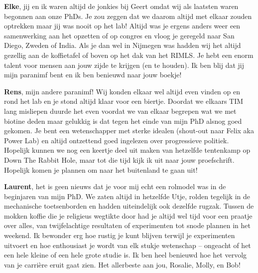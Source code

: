 \textbf{Elke}, jij en ik waren altijd de jonkies bij Geert omdat wij als laatsten waren begonnen aan onze PhDs. Je zou zeggen dat we daarom altijd met elkaar zouden optrekken maar jij was nooit op het lab! Altijd was je ergens anders weer een samenwerking aan het opzetten of op congres en vloog je geregeld naar San Diego, Zweden of India. Als je dan wel in Nijmegen was hadden wij het altijd gezellig aan de koffietafel of boven op het dak van het RIMLS. Je hebt een enorm talent voor mensen aan jouw zijde te krijgen (en te houden). Ik ben blij dat jij mijn paranimf bent en ik ben benieuwd naar jouw boekje!

\textbf{Rens}, mijn andere paranimf! Wij konden elkaar wel altijd even vinden op en rond het lab en je stond altijd klaar voor een biertje. Doordat we elkaars TIM lang misliepen duurde het even voordat we van elkaar begrepen wat we met biotine deden maar gelukkig is dat tegen het einde van mijn PhD alsnog goed gekomen. Je bent een wetenschapper met sterke idealen (shout-out naar Felix aka Power Lab) en altijd ontzettend goed ingelezen over progressieve politiek. Hopelijk kunnen we nog een keertje deel uit maken van hetzelfde tentenkamp op Down The Rabbit Hole, maar tot die tijd kijk ik uit naar jouw proefschrift. Hopelijk komen je plannen om naar het buitenland te gaan uit!

\textbf{Laurent}, het is geen nieuws dat je voor mij echt een rolmodel was in de beginjaren van mijn PhD. We zaten altijd in hetzelfde Utje, rolden tegelijk in de mechanische toetsenborden en hadden uiteindelijk ook dezelfde rugzak. Tussen de mokken koffie die je religieus wegtikte door had je altijd wel tijd voor een praatje over alles, van twijfelachtige resultaten of experimenten tot snode plannen in het weekend. Ik bewonder erg hoe rustig je kunt blijven terwijl je experimenten uitvoert en hoe enthousiast je wordt van elk stukje wetenschap – ongeacht of het een hele kleine of een hele grote studie is. Ik ben heel benieuwd hoe het vervolg van je carrière eruit gaat zien. Het allerbeste aan jou, Rosalie, Molly, en Bob!

